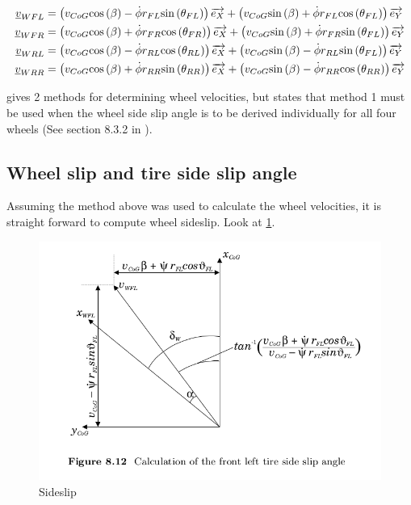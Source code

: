 \begin{align*}
    \underline{ {v} }_{WFL} &= \left( v_{CoG} \text{cos}\left({\beta}\right) - \dot{\phi} r_{FL} \text{sin}\left({\theta_{FL}}\right) \right) \overrightarrow{e_{X}}   +  \left( v_{CoG} \text{sin}\left({\beta}\right) + \dot{\phi} r_{FL} \text{cos}\left({\theta_{FL}}\right) \right) \overrightarrow{e_{Y}}  \\
    \underline{ {v} }_{WFR} &= \left( v_{CoG} \text{cos}\left({\beta}\right) + \dot{\phi} r_{FR} \text{cos}\left({\theta_{FR}}\right) \right) \overrightarrow{e_{X}}   +  \left( v_{CoG} \text{sin}\left({\beta}\right) + \dot{\phi} r_{FR} \text{sin}\left({\theta_{FL}}\right) \right) \overrightarrow{e_{Y}}  \\
    \underline{ {v} }_{WRL} &= \left( v_{CoG} \text{cos}\left({\beta}\right) - \dot{\phi} r_{RL} \text{cos}\left({\theta_{RL}}\right) \right) \overrightarrow{e_{X}}   +  \left( v_{CoG} \text{sin}\left({\beta}\right) - \dot{\phi} r_{RL} \text{sin}\left({\theta_{FL}}\right) \right) \overrightarrow{e_{Y}}  \\
    \underline{ {v} }_{WRR} &= \left( v_{CoG} \text{cos}\left({\beta}\right) + \dot{\phi} r_{RR} \text{sin}\left({\theta_{RR}}\right) \right) \overrightarrow{e_{X}}   +  \left( v_{CoG} \text{sin}\left({\beta}\right) - \dot{\phi} r_{RR} \text{cos}\left({\theta_{RR}}\right) \right) \overrightarrow{e_{Y}} 
\end{align*}



\cite{kiencke} gives 2 methods for determining wheel velocities, but states that method 1 must be used when the wheel side slip angle is to be derived individually for all four wheels (See section 8.3.2 in \cite{kiencke}).

\subsection{Wheel slip and tire side slip angle}    


Assuming the method above was used to calculate the wheel velocities, it is straight forward to compute wheel sideslip. Look at \cref{fig:wheel-sideslip}. 

\begin{figure}
    \centering
    \includegraphics[width=\textwidth]{draft/stolen-figures/wheel-sideslip.png}
    \caption{Sideslip}
    \label{fig:wheel-sideslip}
\end{figure}

